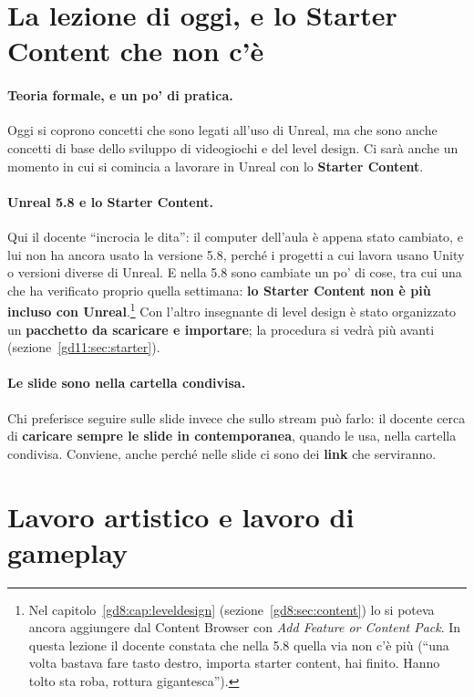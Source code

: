 \section{La lezione di oggi, e lo Starter Content che non c'è}
\label{gd11:sec:intro}

\paragraph{Teoria formale, e un po' di pratica.} Oggi si coprono concetti che
sono legati all'uso di Unreal, ma che sono anche concetti di base dello
sviluppo di videogiochi e del level design. Ci sarà anche un momento in cui si
comincia a lavorare in Unreal con lo \textbf{Starter Content}.

\paragraph{Unreal 5.8 e lo Starter Content.} Qui il docente ``incrocia le
dita'': il computer dell'aula è appena stato cambiato, e lui non ha ancora
usato la versione 5.8, perché i progetti a cui lavora usano Unity o versioni
diverse di Unreal. E nella 5.8 sono cambiate un po' di cose, tra cui una che ha
verificato proprio quella settimana: \textbf{lo Starter Content non è più
incluso con Unreal}.\footnote{Nel capitolo~\ref{gd8:cap:leveldesign}
(sezione~\ref{gd8:sec:content}) lo si poteva ancora aggiungere dal Content
Browser con \emph{Add Feature or Content Pack}. In questa lezione il docente
constata che nella 5.8 quella via non c'è più (``una volta bastava fare tasto
destro, importa starter content, hai finito. Hanno tolto sta roba, rottura
gigantesca'').} Con l'altro insegnante di level design è stato organizzato un
\textbf{pacchetto da scaricare e importare}; la procedura si vedrà più avanti
(sezione~\ref{gd11:sec:starter}).

\paragraph{Le slide sono nella cartella condivisa.} Chi preferisce seguire
sulle slide invece che sullo stream può farlo: il docente cerca di
\textbf{caricare sempre le slide in contemporanea}, quando le usa, nella
cartella condivisa. Conviene, anche perché nelle slide ci sono dei
\textbf{link} che serviranno.

\section{Lavoro artistico e lavoro di gameplay}
\label{gd11:sec:arte-gameplay}

